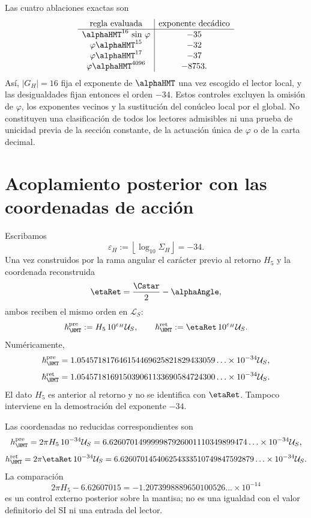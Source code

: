 Las cuatro ablaciones exactas son
\[
\begin{array}{c|c}
\text{regla evaluada}&\text{exponente decádico}\\
\hline
\alphaHMT^{16}\ \text{sin }\varphi&-35\\
\varphi\alphaHMT^{15}&-32\\
\varphi\alphaHMT^{17}&-37\\
\varphi\alphaHMT^{4096}&-8753.
\end{array}
\]
Así, \(|G_H|=16\) fija el exponente de \(\alphaHMT\) una vez escogido el
lector local, y las desigualdades fijan entonces el orden \(-34\). Estos
controles excluyen la omisión de \(\varphi\), los exponentes vecinos y la
sustitución del conúcleo local por el global. No constituyen una
clasificación de todos los lectores admisibles ni una prueba de unicidad
previa de la sección constante, de la actuación única de \(\varphi\) o de la
carta decimal.

\section{Acoplamiento posterior con las coordenadas de acción}

Escribamos
\[
\varepsilon_H:=\left\lfloor\log_{10}\Sigma_H\right\rfloor=-34.
\]
Una vez construidos por la rama angular el carácter previo al retorno \(H_5\)
y la coordenada reconstruida
\[
\etaRet=\frac{\Cstar}{2}-\alphaAngle,
\]
ambos reciben el mismo orden en \(\mathcal L_S\):
\[
\hbar_{\HMT}^{\rm pre}
:=H_5\,10^{\varepsilon_H}\mathcal U_S,
\qquad
\hbar_{\HMT}^{\rm ret}
:=\etaRet\,10^{\varepsilon_H}\mathcal U_S.
\]
Numéricamente,
\[
\hbar_{\HMT}^{\rm pre}
=1.054571817646154469625821829433059\ldots
\times10^{-34}\mathcal U_S,
\]
\[
\hbar_{\HMT}^{\rm ret}
=1.054571816915039061133690584724300\ldots
\times10^{-34}\mathcal U_S.
\]
El dato \(H_5\) es anterior al retorno y no se identifica con \(\etaRet\).
Tampoco interviene en la demostración del exponente \(-34\).

Las coordenadas no reducidas correspondientes son
\[
h_{\HMT}^{\rm pre}
=2\pi H_5\,10^{-34}\mathcal U_S
=6.626070149999987926001110349899474\ldots
\times10^{-34}\mathcal U_S,
\]
\[
h_{\HMT}^{\rm ret}
=2\pi\etaRet\,10^{-34}\mathcal U_S
=6.626070145406254333510749847592879\ldots
\times10^{-34}\mathcal U_S.
\]
La comparación
\[
2\pi H_5-6.62607015
=-1.2073998889650100526\ldots\times10^{-14}
\]
es un control externo posterior sobre la mantisa; no es una igualdad con el
valor definitorio del SI ni una entrada del lector.

